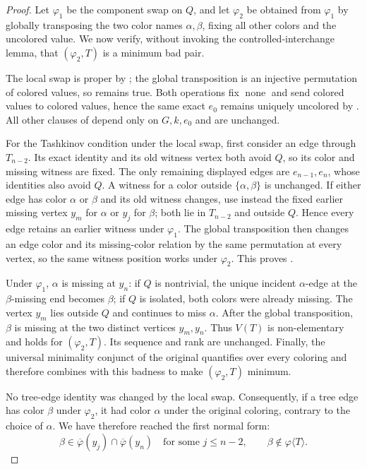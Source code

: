 \begin{proof}
Let \(\varphi_1\) be the component swap
 on \(Q\), and let \(\varphi_2\) be obtained
from \(\varphi_1\) by globally transposing the two color names
\(\alpha,\beta\), fixing all other colors and the uncolored value.  We
now verify, without invoking the controlled-interchange lemma, that
\((\varphi_2,T)\) is a minimum bad pair.

The local swap is proper by ; the
global transposition is an injective permutation of colored values, so
 remains true.  Both operations fix
\(\operatorname{none}\) and send colored values to colored values, hence
the same exact \(e_0\) remains uniquely uncolored by
.  All other clauses of 
depend only on \(G,k,e_0\) and are unchanged.

For the Tashkinov condition under the local swap, first consider an edge
through \(T_{n-2}\).  Its exact identity and its old witness vertex both
avoid \(Q\), so its color and missing witness are fixed.  The only
remaining displayed edges are \(e_{n-1},e_n\), whose identities also
avoid \(Q\).  A witness for a color outside
\(\{\alpha,\beta\}\) is unchanged.  If either edge has color \(\alpha\)
or \(\beta\) and its old witness changes, use instead the fixed earlier
missing vertex \(y_m\) for \(\alpha\) or \(y_j\) for \(\beta\);
both lie in \(T_{n-2}\) and outside \(Q\).  Hence every edge retains an
earlier witness under \(\varphi_1\).  The global transposition then
changes an edge color and its missing-color relation by the same
permutation at every vertex, so the same witness position works under
\(\varphi_2\).  This proves .

Under \(\varphi_1\), \(\alpha\) is missing at \(y_n\): if \(Q\) is
nontrivial, the unique incident \(\alpha\)-edge at the
\(\beta\)-missing end becomes \(\beta\); if \(Q\) is isolated, both
colors were already missing.  The vertex \(y_m\) lies outside \(Q\) and
continues to miss \(\alpha\).  After the global transposition,
\(\beta\) is missing at the two distinct vertices \(y_m,y_n\).
Thus \(V(T)\) is non-elementary and  holds for
\((\varphi_2,T)\).  Its sequence and rank are unchanged.  Finally, the
universal minimality conjunct of the original
 quantifies over every coloring and
therefore combines with this badness to make \((\varphi_2,T)\) minimum.

No tree-edge identity was changed by the local swap.  Consequently, if a
tree edge has color \(\beta\) under \(\varphi_2\), it had color
\(\alpha\) under the original coloring, contrary to the choice of
\(\alpha\).  We have therefore reached the first normal form:
\[
 \beta\in\overline\varphi(y_j)\cap\overline\varphi(y_n)
 \quad\text{for some }j\le n-2,\qquad
 \beta\notin\varphi\langle T\rangle .
\]


\end{proof}
